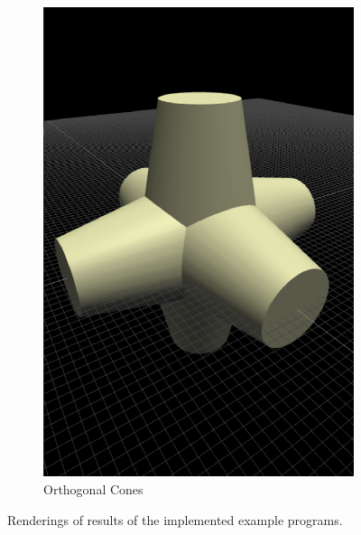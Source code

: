 \begin{figure}
\begin{subfigure}[b]{0.3\linewidth}
    \includegraphics[width=1.0\linewidth]{./images/all_examples/ortho_cones_crop}
    \caption{Orthogonal Cones}
    \label{fig:ex:ortho:cones}
  \end{subfigure}

  \caption{Renderings of results of the implemented example programs.}
  \label{fig:all:examples}
\end{figure}




